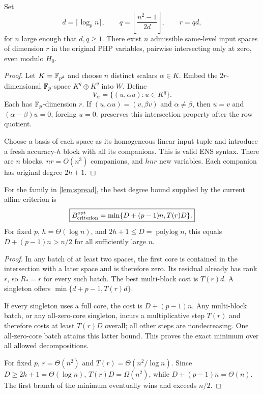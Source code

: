 \begin{lemma}\label{lem:spread}
Set
\[
 d=\lceil\log_p n\rceil,\qquad
 q=\left\lfloor\frac{n^2-1}{2d}\right\rfloor,\qquad r=qd,
\]
for $n$ large enough that $d,q\ge1$. There exist $n$ admissible same-level input spaces of dimension $r$ in the original PHP variables, pairwise intersecting only at zero, even modulo $H_0$.
\end{lemma}
\begin{proof}
Let $K=\mathbb F_{p^d}$ and choose $n$ distinct scalars $\alpha\in K$. Embed the $2r$-dimensional $\mathbb F_p$-space $K^q\oplus K^q$ into $W$. Define
\[
 V_\alpha=\{(u,\alpha u):u\in K^q\}.
\]
Each has $\mathbb F_p$-dimension $r$. If $(u,\alpha u)=(v,\beta v)$ and $\alpha\ne\beta$, then $u=v$ and $(\alpha-\beta)u=0$, forcing $u=0$.  preserves this intersection property after the row quotient.

Choose a basis of each space as its homogeneous linear input tuple and introduce a fresh accuracy-$h$ block with all its companions. This is valid ENS syntax. There are $n$ blocks, $nr=O(n^3)$ companions, and $hnr$ new variables. Each companion has original degree $2h+1$.
\end{proof}

\begin{theorem}\label{thm:spreadcost}
For the family in \cref{lem:spread}, the best degree bound supplied by the current affine criterion is
\[
 \boxed{B_{\rm criterion}^{\rm opt}
       =\min\{D+(p-1)n,T(r)D\}.}
\]
For fixed $p$, $h=\Theta(\log n)$, and $2h+1\le D=\operatorname{polylog}n$, this equals $D+(p-1)n>n/2$ for all sufficiently large $n$.
\end{theorem}
\begin{proof}
In any batch of at least two spaces, the first core is contained in the intersection with a later space and is therefore zero. Its residual already has rank $r$, so $R_*=r$ for every such batch. The best multi-block cost is $T(r)d$. A singleton offers $\min\{d+p-1,T(r)d\}$.

If every singleton uses a full core, the cost is $D+(p-1)n$. Any multi-block batch, or any all-zero-core singleton, incurs a multiplicative step $T(r)$ and therefore costs at least $T(r)D$ overall; all other steps are nondecreasing. One all-zero-core batch attains this latter bound. This proves the exact minimum over all allowed decompositions.

For fixed $p$, $r=\Theta(n^2)$ and $T(r)=\Theta(n^2/\log n)$. Since $D\ge2h+1=\Theta(\log n)$, $T(r)D=\Omega(n^2)$, while $D+(p-1)n=\Theta(n)$. The first branch of the minimum eventually wins and exceeds $n/2$.
\end{proof}

